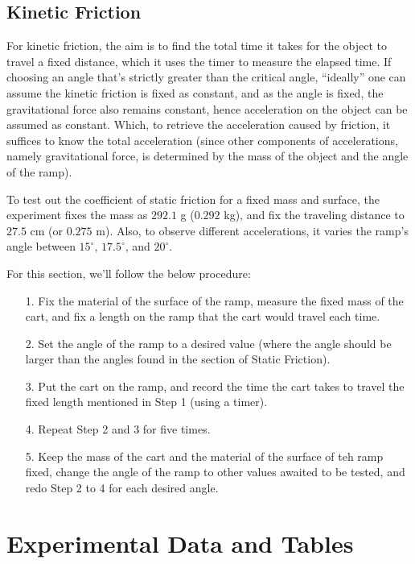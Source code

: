 \documentclass{article}
\begin{document}
\hfil

\subsection{Kinetic Friction}
For kinetic friction, the aim is to find the total time it takes for the object to travel a fixed distance, which it uses the timer to measure the elapsed time. If choosing an angle that's strictly greater than the critical angle, ``ideally'' one can assume the kinetic friction is fixed as constant, and as the angle is fixed, the gravitational force also remains constant, hence acceleration on the object can be assumed as constant. Which, to retrieve the acceleration caused by friction, it suffices to know the total acceleration (since other components of accelerations, namely gravitational force, is determined by the mass of the object and the angle of the ramp). 

To test out the coefficient of static friction for a fixed mass and surface, the experiment fixes the mass as $292.1$ g ($0.292$ kg), and fix the traveling distance to $27.5$ cm (or $0.275$ m). Also, to observe different accelerations, it varies the ramp's angle between $15^\circ$, $17.5^\circ$, and $20^\circ$.

\hfil

For this section, we'll follow the below procedure:
\begin{itemize}
    \item[1.] Fix the material of the surface of the ramp, measure the fixed mass of the cart, and fix a length on the ramp that the cart would travel each time.
    \item[2.] Set the angle of the ramp to a desired value (where the angle should be larger than the angles found in the section of Static Friction).
    \item[3.] Put the cart on the ramp, and record the time the cart takes to travel the fixed length mentioned in Step 1 (using a timer).
    \item[4.] Repeat Step 2 and 3 for five times.
    \item[5.] Keep the mass of the cart and the material of the surface of teh ramp fixed, change the angle of the ramp to other values awaited to be tested, and redo Step 2 to 4 for each desired angle. 
\end{itemize}

\pagebreak

\section{Experimental Data and Tables}
\end{document}
